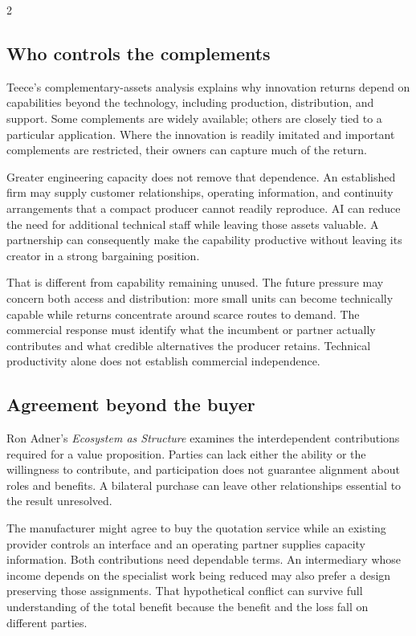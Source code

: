 \begin{multicols}{2}
\subsection{Who controls the
complements}\label{who-controls-the-complements}

Teece's complementary-assets analysis \citep{teece1986innovation}
explains why innovation returns depend on capabilities beyond the
technology, including production, distribution, and support. Some
complements are widely available; others are closely tied to a
particular application. Where the innovation is readily imitated and
important complements are restricted, their owners can capture much of
the return.

Greater engineering capacity does not remove that dependence. An
established firm may supply customer relationships, operating
information, and continuity arrangements that a compact producer cannot
readily reproduce. AI can reduce the need for additional technical staff
while leaving those assets valuable. A partnership can consequently make
the capability productive without leaving its creator in a strong
bargaining position.

That is different from capability remaining unused. The future pressure
may concern both access and distribution: more small units can become
technically capable while returns concentrate around scarce routes to
demand. The commercial response must identify what the incumbent or
partner actually contributes and what credible alternatives the producer
retains. Technical productivity alone does not establish commercial
independence.

\subsection{Agreement beyond the
buyer}\label{agreement-beyond-the-buyer}

Ron Adner's \emph{Ecosystem as Structure} \citep{adner2017ecosystem}
examines the interdependent contributions required for a value
proposition. Parties can lack either the ability or the willingness to
contribute, and participation does not guarantee alignment about roles
and benefits. A bilateral purchase can leave other relationships
essential to the result unresolved.

The manufacturer might agree to buy the quotation service while an
existing provider controls an interface and an operating partner
supplies capacity information. Both contributions need dependable terms.
An intermediary whose income depends on the specialist work being
reduced may also prefer a design preserving those assignments. That
hypothetical conflict can survive full understanding of the total
benefit because the benefit and the loss fall on different parties.


\end{multicols}

